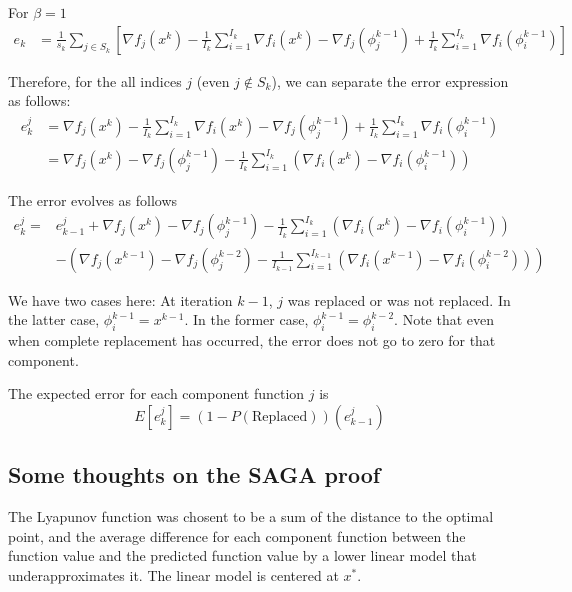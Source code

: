 \documentclass[11pt]{article}
\begin{document}
For $\beta=1$ 
\begin{align*}
	e_k &= \frac{1}{s_k} \sum_{j \in S_k} \left[  \nabla f_j(x^{k}) - \frac{1}{I_k} \sum_{i = 1}^{I_{k}}  \nabla f_i(x^{k}) -  \nabla f_j(\phi^{k-1}_j) + \frac{1}{I_{k}} \sum_{i = 1}^{I_{k}}  \nabla f_i (\phi_i^{k-1})\right] 
\end{align*}

Therefore, for the all indices $j$ (even $j \not \in S_k$), we can separate the error expression as follows: 
\begin{align*}
	e_k^j &=  \nabla f_j(x^{k}) - \frac{1}{I_k} \sum_{i = 1}^{I_{k}}  \nabla f_i(x^{k}) -  \nabla f_j(\phi^{k-1}_j) + \frac{1}{I_{k}} \sum_{i = 1}^{I_{k}}  \nabla f_i (\phi_i^{k-1})\\
	&=  \nabla f_j(x^{k}) -  \nabla f_j(\phi^{k-1}_j) - \frac{1}{I_k} \sum_{i = 1}^{I_{k}} \left(  \nabla f_i(x^{k})-  \nabla f_i (\phi_i^{k-1})\right) 
\end{align*}

The error evolves as follows 
\begin{align*}
	e_k^j =& e_{k-1}^j +  \nabla f_j(x^{k}) -  \nabla f_j(\phi^{k-1}_j) - \frac{1}{I_k} \sum_{i = 1}^{I_{k}} \left(  \nabla f_i(x^{k})-  \nabla f_i (\phi_i^{k-1})\right) \\
	&- \left(  \nabla f_j(x^{k-1}) -  \nabla f_j(\phi^{k-2}_j) - \frac{1}{I_{k-1}} \sum_{i = 1}^{I_{k-1}} \left(  \nabla f_i(x^{k-1})-  \nabla f_i (\phi_i^{k-2})\right) \right) 
\end{align*}

We have two cases here: At iteration $k-1$, $j$ was replaced or was not replaced. In the latter case, $\phi_i^{k-1} = x^{k-1}$. In the former case, $\phi_i^{k-1} = \phi_i^{k-2}$. Note that even when complete replacement has occurred, the error does not go to zero for that component. 

The expected error for each component function $j$ is 
\begin{equation*}
	E[e_k^j]= (1-P(\mbox{Replaced})) \left( e_{k-1}^j \right) 
\end{equation*}


\subsection{Some thoughts on the SAGA proof}

The Lyapunov function was chosent to be a sum of the distance to the optimal point, and the average difference for each component function between the function value and the predicted function value by a lower linear model that underapproximates it. The linear model is centered at $x^*$.
\end{document}
